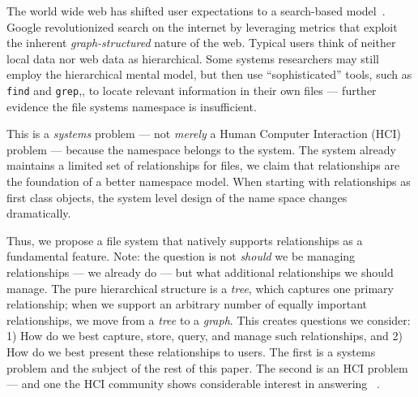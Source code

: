 The world wide web has shifted user expectations to a search-based 
model~\cite{rosenfeld2002information}.
Google revolutionized search on the internet by
leveraging metrics that exploit the inherent \emph{graph-structured} nature of the web.
Typical users think of neither  local data nor web data as hierarchical.
Some systems researchers may still employ the hierarchical mental model, but then
use ``sophisticated'' tools, such as \texttt{find} 
and \texttt{grep},, to locate relevant information in their own files --- further
evidence the file systems namespace is insufficient.

This is a \textit{systems} problem --- not \emph{merely} a Human Computer Interaction (HCI) 
problem ---
because the namespace belongs to the system. The system already maintains a limited
set of relationships for files, we claim that relationships
are the foundation of a better namespace model.
When starting with relationships as first class objects, the system level design
of the name space changes dramatically.

Thus, we propose a file system that natively supports relationships
as a fundamental feature. Note: the question is not \textit{should} we
be managing relationships --- we already do --- but what additional relationships
we should manage. The pure hierarchical structure is a \textit{tree}, which captures one primary relationship;
when we support an arbitrary number of equally important relationships, we
move from a \textit{tree} to a \textit{graph}.  This creates questions we consider: 1) 
How do we best capture, store, query,
and manage such relationships, and 2) How do we best present these
relationships to users.
The first is a systems problem and the subject of the rest of this paper.
The second is an HCI problem --- and one the HCI community shows considerable
interest in answering~
\cite{tunkelang2009faceted,hearst2006design,klungre2018evaluating,walton2015searching,walton2017looking,cleverley2015retrieving,huurdeman2016active,harper2013file,karlson2011version,jensen2010life,ma2009file,karger2006data,jones2005don,marsden2003improving,vicente1988accommodating,vitale2018hoarding}.

